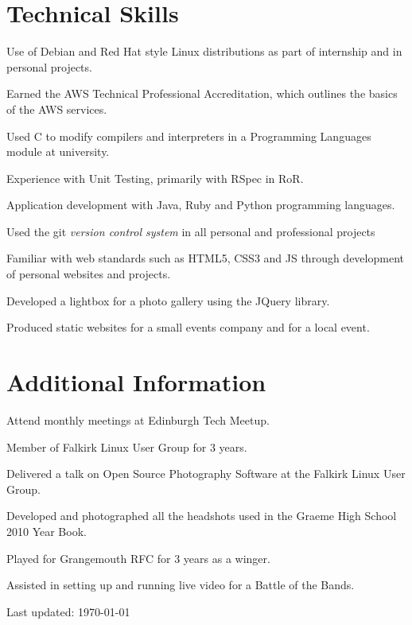 \documentclass[11pt,a4paper]{article}
\renewenvironment{itemize}{
  \begin{list}{}{
    \setlength{\leftmargin}{1em}
    \setlength{\itemsep}{0.25em}
    \setlength{\parskip}{0pt}
    \setlength{\parsep}{0.25em}
    \renewcommand{\labelitemi}{$\bullet$}
  }
}{
  \end{list}
}
\begin{document}
\section*{Technical Skills}


\begin{itemize}
    \item Use of Debian and Red Hat style Linux distributions as part of internship and in personal projects.
    \item Earned the AWS Technical Professional Accreditation, which outlines the basics of the AWS services.
    \item Used C to modify compilers and interpreters in a Programming Languages module at university.
    \item Experience with Unit Testing, primarily with RSpec in RoR.
    \item Application development with Java, Ruby and Python programming languages.
    \item Used the git \emph{version control system} in all personal and professional projects
    \item Familiar with web standards such as HTML5, CSS3 and JS through development of personal websites and projects.
    \item Developed a lightbox for a photo gallery using the JQuery library.
    \item Produced static websites for a small events company and for a local event.
\end{itemize}

\section*{Additional Information}

\begin{itemize}
    \item Attend monthly meetings at Edinburgh Tech Meetup.
    \item Member of Falkirk Linux User Group for 3 years.
    \item Delivered a talk on Open Source Photography Software at the Falkirk
        Linux User Group.
    \item Developed and photographed all the headshots used in the Graeme High
        School 2010 Year Book.
    \item Played for Grangemouth RFC for 3 years as a winger.
    \item Assisted in setting up and running live video for a Battle of
        the Bands.
\end{itemize}


\medskip
\begin{center}
  \begin{small}
    Last updated: \today
  \end{small}
\end{center}
\end{document}
